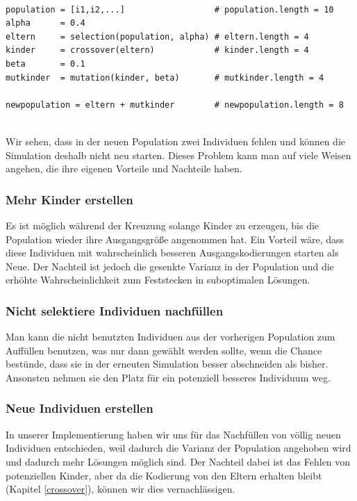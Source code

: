             \begin{mdframed}
            \begin{verbatim}

population = [i1,i2,...]                  # population.length = 10
alpha      = 0.4
eltern     = selection(population, alpha) # eltern.length = 4
kinder     = crossover(eltern)            # kinder.length = 4
beta       = 0.1
mutkinder  = mutation(kinder, beta)       # mutkinder.length = 4

newpopulation = eltern + mutkinder        # newpopulation.length = 8
            \end{verbatim}
            \end{mdframed}
            \hfill \\
            \noindent
            Wir sehen, dass in der neuen Population zwei Individuen fehlen und können die Simulation deshalb nicht neu starten. Dieses Problem kann man auf viele Weisen angehen, die ihre eigenen Vorteile und Nachteile haben. 

            \subsubsection*{Mehr Kinder erstellen}
                Es ist möglich während der Kreuzung solange Kinder zu erzeugen, bis die Population wieder ihre Ausgangsgröße angenommen hat. Ein Vorteil wäre, dass diese Individuen mit wahrscheinlich besseren Ausgangskodierungen starten als Neue. Der Nachteil ist jedoch die gesenkte Varianz in der Population und die erhöhte Wahrscheinlichkeit zum Feststecken in suboptimalen Lösungen.

            \subsubsection*{Nicht selektiere Individuen nachfüllen}
                Man kann die nicht benutzten Individuen aus der vorherigen Population zum Auffüllen benutzen, was nur dann gewählt werden sollte, wenn die Chance bestünde, dass sie in der erneuten Simulation besser abschneiden als bisher. Ansonsten nehmen sie den Platz für ein potenziell besseres Individuum weg.

            \subsubsection*{Neue Individuen erstellen}
                In unserer Implementierung haben wir uns für das Nachfüllen von völlig neuen Individuen entschieden, weil dadurch die Varianz der Population angehoben wird und dadurch mehr Lösungen möglich sind. Der Nachteil dabei ist das Fehlen von potenziellen Kinder, aber da die Kodierung von den Eltern erhalten bleibt (Kapitel \ref{crossover}), können wir dies vernachlässigen.
\newpage

